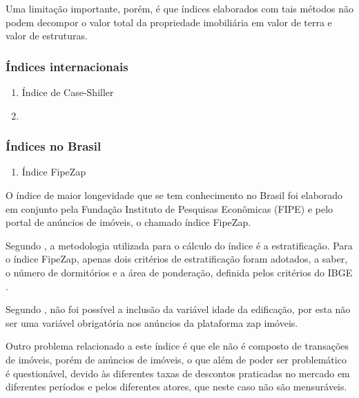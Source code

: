 \documentclass[
	12pt,				%
	oneside,			%
	a4paper,			%
	chapter=TITLE,		%
	section=TITLE,		%
	english,			%
	brazil				%
	]{abntex2}
\begin{document}
Uma limitação importante, porém, é que índices elaborados com tais
métodos não podem decompor o valor total da propriedade imobiliária em
valor de terra e valor de estruturas.

\subsubsection{Índices internacionais}\label{uxedndices-internacionais}
\begin{enumerate}
\def\labelenumi{\alph{enumi}.}
\item
  Índice de Case-Shiller
\item
\end{enumerate}
\subsubsection{Índices no Brasil}\label{uxedndices-no-brasil}
\begin{enumerate}
\def\labelenumi{\alph{enumi}.}
\tightlist
\item
  Índice FipeZap
\end{enumerate}
O índice de maior longevidade que se tem conhecimento no Brasil foi
elaborado em conjunto pela Fundação Instituto de Pesquisas Econômicas
(FIPE) e pelo portal de anúncios de imóveis, o chamado índice FipeZap.

Segundo \textcite{fipezap}, a metodologia utilizada para o cálculo do
índice é a estratificação. Para o índice FipeZap, apenas dois critérios
de estratificação foram adotados, a saber, o número de dormitórios e a
área de ponderação, definida pelos critérios do IBGE
\autocite[10]{fipezap}.

Segundo \textcite{fipezap}, não foi possível a inclusão da variável
idade da edificação, por esta não ser uma variável obrigatória nos
anúncios da plataforma zap imóveis.

Outro problema relacionado a este índice é que ele não é composto de
transações de imóveis, porém de anúncios de imóveis, o que além de poder
ser problemático é questionável, devido às diferentes taxas de descontos
praticadas no mercado em diferentes períodos e pelos diferentes atores,
que neste caso não são mensuráveis.
\end{document}
